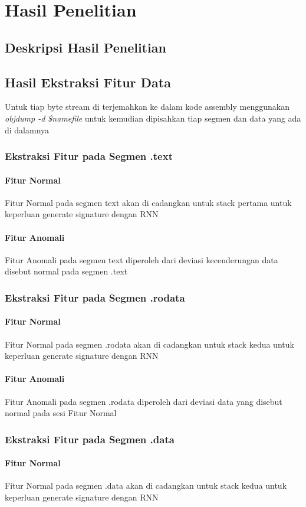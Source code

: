\documentclass{article}
\begin{document}
\chapter{Hasil Penelitian}
\section{Deskripsi Hasil Penelitian}
\section{Hasil Ekstraksi Fitur Data}
Untuk tiap byte stream di terjemahkan ke dalam kode assembly menggunakan \textit{objdump -d \$namefile} untuk kemudian dipisahkan tiap segmen dan data yang ada di dalamnya
\subsection{Ekstraksi Fitur pada Segmen .text}
\subsubsection{Fitur Normal}
Fitur Normal pada segmen text akan di cadangkan untuk stack pertama untuk keperluan generate signature dengan RNN
\subsubsection{Fitur Anomali}
Fitur Anomali pada segmen text diperoleh dari deviasi kecenderungan data disebut normal pada segmen .text
\subsection{Ekstraksi Fitur pada Segmen .rodata}
\subsubsection{Fitur Normal}
Fitur Normal pada segmen .rodata akan di cadangkan untuk stack kedua untuk keperluan generate signature dengan RNN
\subsubsection{Fitur Anomali}
Fitur Anomali pada segmen .rodata diperoleh dari deviasi data yang disebut normal pada sesi Fitur Normal
\subsection{Ekstraksi Fitur pada Segmen .data}
\subsubsection{Fitur Normal}
Fitur Normal pada segmen .data akan di cadangkan untuk stack kedua untuk keperluan generate signature dengan RNN
\end{document}
